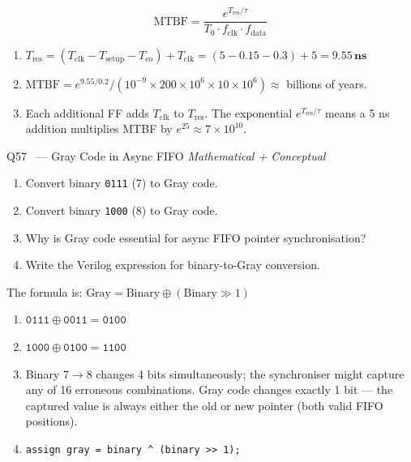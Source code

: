 \documentclass[12pt,a4paper]{article}
\newcommand{\advanced}{%
  \fbox{\textcolor{advred}{\bfseries\sffamily\small ADVANCED}}}
\begin{document}
\begin{answerbox}
\[
\text{MTBF} = \frac{e^{T_{\text{res}}/\tau}}{T_0 \cdot f_{\text{clk}} \cdot f_{\text{data}}}
\]
\begin{enumerate}[label=\textbf{\alph*)}]
  \item $T_{\text{res}} = (T_{\text{clk}} - T_{\text{setup}} - T_{\text{co}}) + T_{\text{clk}} = (5 - 0.15 - 0.3) + 5 = \mathbf{9.55\,ns}$
  \item $\text{MTBF} = e^{9.55/0.2} / (10^{-9} \times 200\times10^6 \times 10\times10^6) \approx$ billions of years.
  \item Each additional FF adds $T_{\text{clk}}$ to $T_{\text{res}}$. The exponential $e^{T_{\text{res}}/\tau}$ means a 5 ns addition multiplies MTBF by $e^{25} \approx 7\times10^{10}$.
\end{enumerate}
\end{answerbox}

\begin{questionbox}{Q57 \advanced\ --- Gray Code in Async FIFO \hfill\textit{Mathematical + Conceptual}}
\begin{enumerate}[label=\textbf{\alph*)}]
  \item Convert binary \texttt{0111} (7) to Gray code.
  \item Convert binary \texttt{1000} (8) to Gray code.
  \item Why is Gray code essential for async FIFO pointer synchronisation?
  \item Write the Verilog expression for binary-to-Gray conversion.
\end{enumerate}
\end{questionbox}

\begin{answerbox}
The formula is: $\text{Gray} = \text{Binary} \oplus (\text{Binary} \gg 1)$

\begin{enumerate}[label=\textbf{\alph*)}]
  \item $\texttt{0111} \oplus \texttt{0011} = \texttt{0100}$
  \item $\texttt{1000} \oplus \texttt{0100} = \texttt{1100}$
  \item Binary 7$\to$8 changes 4 bits simultaneously; the synchroniser might capture any of 16 erroneous combinations. Gray code changes exactly 1 bit --- the captured value is always either the old or new pointer (both valid FIFO positions).
  \item \texttt{assign gray = binary \textasciicircum\ (binary >> 1);}
\end{enumerate}
\end{answerbox}
\end{document}
